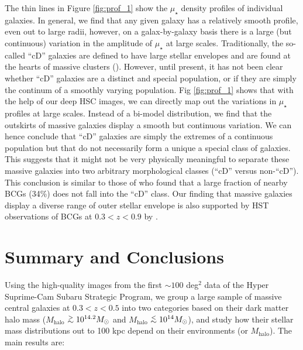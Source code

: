 \documentclass[a4paper,fleqn,usenatbib]{mnras}
\def\simlt{\lower.5ex\hbox{$\; \buildrel < \over {\sim} \;$}}
\def\simgt{\lower.5ex\hbox{$\; \buildrel > \over {\sim} \;$}}
\def\mhalo{{$M_{\mathrm{halo}}$}}
\def\mden{{$\mu_{\star}$}}
\begin{document}
   The thin lines in Figure \ref{fig:prof_1} show the \mden{} density profiles of 
   individual galaxies. 
   In general, we find that any given galaxy has a relatively smooth profile, even out 
   to large radii, however, on a galax-by-galaxy basis there is a large (but continuous) 
   variation in the amplitude of \mden{} at large scales. 
   Traditionally, the so-called ``cD'' galaxies are defined to have large stellar 
   envelopes and are found at the hearts of massive clusters (\citealt{Matthews1964, 
   Schombert1988}). 
   However, until present, it has not been clear whether ``cD'' galaxies are a distinct 
   and special population, or if they are simply the continum of a smoothly varying 
   population. 
   Fig \ref{fig:prof_1} shows that with the help of our deep HSC images, we can directly 
   map out the variations in \mden{} profiles at large scales. 
   Instead of a bi-model distribution, we find that the outskirts of massive galaxies 
   display a smooth but continuous variation. 
   We can hence conclude that ``cD'' galaxies are simply the extremes of a continuous 
   population but that do not necessarily form a unique a special class of galaxies. 
   This suggests that it might not be very physically meaningful to separate these 
   massive galaxies into two arbitrary morphological classes (``cD'' versus non-``cD''). 
   This conclusion is similar to those of \citep{Zhao2015} who found that a large 
   fraction of nearby BCGs (34\%) does not fall into the ``cD'' class. 
   Our finding that massive galaxies display a diverse range of outer stellar 
   envelope is also supported by HST observations of BCGs at $0.3 < z <0.9$ 
   by \citealt{Bai2014}.
   


\section{Summary and Conclusions}
    \label{sec:summary}
    
    Using the high-quality images from the first $\sim100$ deg$^2$ data of the 
    Hyper Suprime-Cam Subaru Strategic Program, we group a large sample of massive 
    central galaxies at $0.3 < z < 0.5$ into two categories based on their dark matter
    halo mass (\mhalo{}$\simgt 10^{14.2} M_{\odot}$ and 
    \mhalo{}$\simlt 10^{14} M_{\odot}$), and study how their stellar mass distributions 
    out to 100 kpc depend on their environments (or \mhalo{}). 
    The main results are:  
    
\end{document}
